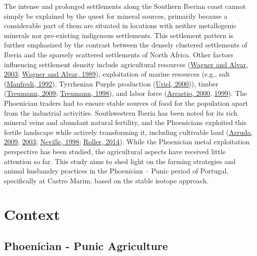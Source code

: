 \documentclass[preprint, 3p, authoryear]{elsarticle} %
\begin{document}
The intense and prolonged settlements along the Southern Iberian coast cannot simply be explained by the quest for mineral sources, primarily because a considerable part of them are situated in locations with neither metallogenic minerals nor pre-existing indigenous settlements. This settlement pattern is further emphasized by the contrast between the densely clustered settlements of Iberia and the sparsely scattered settlements of North Africa. Other factors influencing settlement density include agricultural resources (\protect\hyperlink{ref-wagner_alvar03}{Wagner and Alvar, 2003}; \protect\hyperlink{ref-wagner_alvar89}{Wagner and Alvar, 1989}), exploitation of marine resources (e.g., salt (\protect\hyperlink{ref-manfredi92}{Manfredi, 1992}), Tyrrhenian Purple production (\protect\hyperlink{ref-uriel00}{Uriel, 2000})), timber (\protect\hyperlink{ref-treumann09}{Treumann, 2009}; \protect\hyperlink{ref-treumann98}{Treumann, 1998}), and labor force (\protect\hyperlink{ref-arrastio00}{Arrastio, 2000}, \protect\hyperlink{ref-arrastio99}{1999}). The Phoenician traders had to ensure stable sources of food for the population apart from the industrial activities. Southwestern Iberia has been noted for its rich mineral veins and abundant natural fertility, and the Phoenicians exploited this fertile landscape while actively transforming it, including cultivable land (\protect\hyperlink{ref-arruda09}{Arruda, 2009}, \protect\hyperlink{ref-arruda03}{2003}; \protect\hyperlink{ref-neville98}{Neville, 1998}; \protect\hyperlink{ref-roller14}{Roller, 2014}). While the Phoenician metal exploitation perspective has been studied, the agricultural aspects have received little attention so far. This study aims to shed light on the farming strategies and animal husbandry practices in the Phoenician -- Punic period of Portugal, specifically at Castro Marim, based on the stable isotope approach.

\hypertarget{context}{%
\section{Context}\label{context}}

\hypertarget{phoenician---punic-agriculture}{%
\subsection{Phoenician - Punic Agriculture}\label{phoenician---punic-agriculture}}
\end{document}
